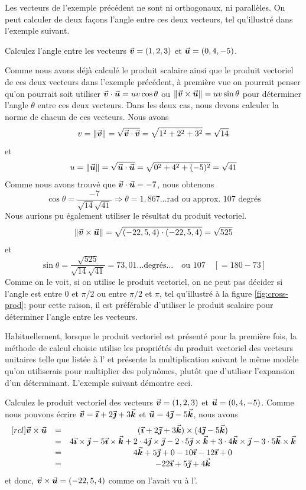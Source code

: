 Les vecteurs de l'exemple précédent ne sont ni orthogonaux, ni parallèles.  
On peut calculer de deux façons l'angle entre ces deux vecteurs, tel qu'illustré
dans l'exemple suivant.

\begin{exemple}
Calculez l'angle entre les vecteurs $\vec{\boldsymbol{v}} = (1, 2, 3)$ et $\vec{\boldsymbol{u}} = (0, 4, -5)$.

\solution
Comme nous avons déjà calculé le produit scalaire ainsi que le produit vectoriel
de ces deux vecteurs dans l'exemple précédent, à première vue on pourrait penser
qu'on pourrait soit utiliser
$\vec{\boldsymbol{v}}\cdot\vec{\boldsymbol{u}} = uv\cos\theta$ ou $\lVert\vec{\boldsymbol{v}}\times\vec{\boldsymbol{u}}\rVert = uv\sin\theta$
pour déterminer l'angle $\theta$ entre ces deux vecteurs.  Dans les deux cas, nous
devons calculer la norme de chacun de ces vecteurs.  Nous avons
\[
v = \lVert\vec{\boldsymbol{v}}\rVert = \sqrt{\vec{\boldsymbol{v}}\cdot\vec{\boldsymbol{v}}} = \sqrt{1^2 + 2^2 + 3^2} = \sqrt{14}
\]
et
\[
u = \lVert\vec{\boldsymbol{u}}\rVert = \sqrt{\vec{\boldsymbol{u}}\cdot\vec{\boldsymbol{u}}} = \sqrt{0^2 + 4^2 + (-5)^2} = \sqrt{41}
\]
Comme nous avons trouvé que $\vec{\boldsymbol{v}}\cdot\vec{\boldsymbol{u}}=-7$, nous obtenons
\[
\cos\theta = \frac{-7}{\sqrt{14}\sqrt{41}} \Rightarrow \theta = 1,867\ldots \mbox{rad ou approx. $107$ degrés}
\]
Nous aurions pu également utiliser le résultat du produit vectoriel.
\[
\lVert\vec{\boldsymbol{v}}\times\vec{\boldsymbol{u}}\rVert = \sqrt{(-22, 5, 4)\cdot(-22, 5, 4)} = \sqrt{525}
\]
et
\[
\sin\theta = \frac{\sqrt{525}}{\sqrt{14}\sqrt{41}} = 73,01\ldots\mbox{degrés} \ldots\quad\mbox{ou }107 \quad [=180-73]
\]
Comme on le voit, si on utilise le produit vectoriel, on ne peut pas décider si l'angle est entre 0 et $\pi/2$ ou
entre $\pi/2$ et $\pi$, tel qu'illustré à la figure \ref{fig:cross-prod}; 
pour cette raison, il est préférable d'utiliser le produit scalaire pour déterminer l'angle entre les vecteurs.
\end{exemple}


Habituellement, lorsque le produit vectoriel est présenté pour la première fois,
la méthode de calcul choisie utilise les propriétés du produit vectoriel des vecteurs unitaires
telle que listée à l'
et présente la multiplication suivant le même modèle qu'on utiliserais pour
multiplier des polynômes, plutôt que d'utiliser l'expansion d'un déterminant.
L'exemple suivant démontre ceci.
\begin{exemple}
Calculez le produit vectoriel des vecteurs $\vec{\boldsymbol{v}} = (1, 2, 3)$ et $\vec{\boldsymbol{u}} = (0, 4, -5)$.
\solution
Comme nous pouvons écrire $\vec{\boldsymbol{v}} = \vec{\boldsymbol{\imath}} + 2\vec{\boldsymbol{\jmath}} + 3 \vec{\boldsymbol{k}}$ et 
$\vec{\boldsymbol{u}} = 4\vec{\boldsymbol{\jmath}} - 5\vec{\boldsymbol{k}}$, nous avons
\[
\begin{matrix}[rcl]
\vec{\boldsymbol{v}}\times\vec{\boldsymbol{u}} &=& (\vec{\boldsymbol{\imath}} + 2\vec{\boldsymbol{\jmath}} + 3 \vec{\boldsymbol{k}})\times(4\vec{\boldsymbol{\jmath}} - 5\vec{\boldsymbol{k}}) \\
&=& 4\vec{\boldsymbol{\imath}}\times\vec{\boldsymbol{\jmath}} -5\vec{\boldsymbol{\imath}}\times\vec{\boldsymbol{k}} + 2\cdot4\vec{\boldsymbol{\jmath}}\times\vec{\boldsymbol{\jmath}} -2\cdot5\vec{\boldsymbol{\jmath}}\times\vec{\boldsymbol{k}} + 3\cdot4\vec{\boldsymbol{k}}\times\vec{\boldsymbol{\jmath}} -3\cdot5\vec{\boldsymbol{k}}\times\vec{\boldsymbol{k}}\\
&=& 4\vec{\boldsymbol{k}} +5\vec{\boldsymbol{\jmath}} + 0 -10\vec{\boldsymbol{\imath}} -12\vec{\boldsymbol{\imath}} + 0\\
&=& -22\vec{\boldsymbol{\imath}} + 5\vec{\boldsymbol{\jmath}} +4\vec{\boldsymbol{k}}
\end{matrix}
\]
et donc, $\vec{\boldsymbol{v}}\times \vec{\boldsymbol{u}} = (-22, 5, 4)$ comme on l'avait vu à
l'.
\end{exemple}


